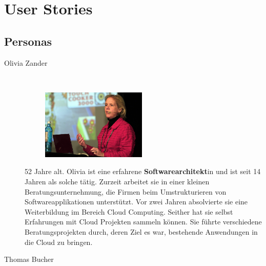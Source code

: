 \section{User Stories}
	\subsection{Personas}
		\begin{description}
			\item[Olivia Zander]\label{olivia}\ \newline
				\begin{minipage}[t]{0.35\textwidth} 
					\begin{figure}[H]
						\vspace{-0.75cm}
						\includegraphics[trim=0cm 0cm 0cm 0cm, clip=true, width=5cm]{requirements/media/img/oliviaZander.jpg}
						\caption[Symbolbild Persona Olivia Zander\newline 
						]
						{\label{Olivia Zander}}
					\end{figure}
				\end{minipage}
				\begin{minipage}[t]{0.55\textwidth}
					52 Jahre alt.
					Olivia ist eine erfahrene \textbf{Softwarearchitekt}in 
					und ist seit 14 Jahren als solche tätig.
					Zurzeit arbeitet sie in einer kleinen Beratungsunternehmung, 
					die Firmen beim Umstrukturieren von Softwareapplikationen unterstützt.
					Vor zwei Jahren absolvierte sie eine Weiterbildung im Bereich Cloud Computing.
					Seither hat sie selbst Erfahrungen mit Cloud Projekten sammeln können. 
					Sie führte verschiedene Beratungsprojekten durch, deren Ziel es war,
					bestehende Anwendungen in die Cloud zu bringen.
				\end{minipage}
			\item[Thomas Bucher]\label{thomas}\ \newline
				\begin{minipage}[t]{0.35\textwidth} 
					\begin{figure}[H]
						\vspace{-0.75cm}

\end{figure}
\end{minipage}
\end{description}
